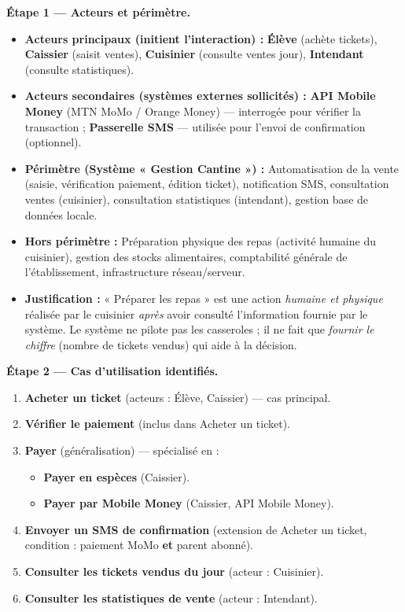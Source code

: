 \documentclass[11pt]{article}
\begin{document}
\begin{exoresolu}

\textbf{Étape 1 — Acteurs et périmètre.}
\begin{itemize}
  \item \textbf{Acteurs principaux (initient l'interaction) :} \textbf{Élève} (achète tickets), \textbf{Caissier} (saisit ventes), \textbf{Cuisinier} (consulte ventes jour), \textbf{Intendant} (consulte statistiques).
  \item \textbf{Acteurs secondaires (systèmes externes sollicités) :} \textbf{API Mobile Money} (MTN MoMo / Orange Money) — interrogée pour vérifier la transaction ; \textbf{Passerelle SMS} — utilisée pour l'envoi de confirmation (optionnel).
  \item \textbf{Périmètre (Système « Gestion Cantine ») :} Automatisation de la vente (saisie, vérification paiement, édition ticket), notification SMS, consultation ventes (cuisinier), consultation statistiques (intendant), gestion base de données locale.
  \item \textbf{Hors périmètre :} Préparation physique des repas (activité humaine du cuisinier), gestion des stocks alimentaires, comptabilité générale de l'établissement, infrastructure réseau/serveur.
  \item \textbf{Justification :} « Préparer les repas » est une action \emph{humaine et physique} réalisée par le cuisinier \emph{après} avoir consulté l'information fournie par le système. Le système ne pilote pas les casseroles ; il ne fait que \emph{fournir le chiffre} (nombre de tickets vendus) qui aide à la décision.
\end{itemize}

\textbf{Étape 2 — Cas d'utilisation identifiés.}
\begin{enumerate}
  \item \textbf{Acheter un ticket} (acteurs : Élève, Caissier) — cas principal.
  \item \textbf{Vérifier le paiement} (inclus dans Acheter un ticket).
  \item \textbf{Payer} (généralisation) — spécialisé en :
        \begin{itemize}
          \item \textbf{Payer en espèces} (Caissier).
          \item \textbf{Payer par Mobile Money} (Caissier, API Mobile Money).
        \end{itemize}
  \item \textbf{Envoyer un SMS de confirmation} (extension de Acheter un ticket, condition : paiement MoMo \textbf{et} parent abonné).
  \item \textbf{Consulter les tickets vendus du jour} (acteur : Cuisinier).
  \item \textbf{Consulter les statistiques de vente} (acteur : Intendant).
\end{enumerate}


\end{exoresolu}
\end{document}
